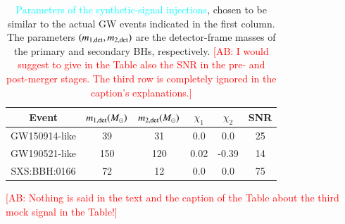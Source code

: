 \documentclass[twocolumn,prd,aps,superscriptaddress,preprintnumbers,tightenlines,showpacs,nofootinbib,eqsecnum,amsfonts,amsmath]{revtex4-1}
\newcommand{\ab}[1]{\textcolor{cyan}{#1}}
\newcommand{\comment}[1]{\textcolor{red}{[#1]}}
\newcommand{\Mo}{M_{\odot}}
\begin{document}
\begin{table}[h!]
\begin{center}
\begin{tabular}{ |c|c|c|c|c|c| }
 \hline
 Event & $m_{\rm 1,det} (\Mo)$ &  $m_{\rm 2,det} (\Mo)$ & $\chi_{1}$ & $\chi_{2}$ & SNR \\ 
 \hline
 GW150914-like & 39 & 31 & 0.0 & 0.0 & 25 \\
 GW190521-like & 150 & 120 & 0.02 & -0.39 & 14 \\ 
 SXS:BBH:0166 & 72 & 12  & 0.0 & 0.0 & 75 \\
 \hline
\end{tabular}
\caption{\ab{Parameters of the synthetic-signal injections}, chosen to be similar to the actual GW events indicated in the first column. The parameters 
$(m_{\rm 1,det},m_{\rm 2,det})$ are the detector-frame masses of the primary and secondary BHs, respectively. \comment{AB: I would suggest to give in the Table also the SNR in the pre- and post-merger stages. The third row is completely ignored in the caption's explanations.}}
\label{tab:injection_values}
\end{center}
\end{table}

\comment{AB: Nothing is said in the text and the caption of the Table about the third mock signal in the Table!}
\end{document}
